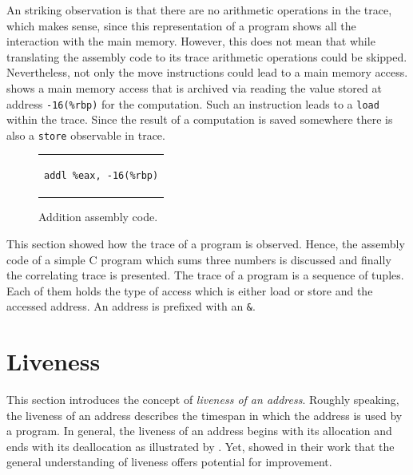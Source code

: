\documentclass[onecolumn, openright, master, english, signatures]{dbrgrptt}
\begin{document}
An striking observation is that there are no arithmetic operations in the \ac{trace}, which makes sense, since this representation of a program shows all the interaction with the main memory.
However, this does not mean that while translating the assembly code to its \ac{trace} arithmetic operations could be skipped.
Nevertheless, not only the move instructions could lead to a main memory access.
 shows a main memory access that is archived via reading the value stored at address \texttt{-16(\%rbp)} for the computation.
Such an instruction leads to a \texttt{load} within the \ac{trace}.
Since the result of a computation is saved somewhere there is also a \texttt{store} observable in \ac{trace}.

\begin{figure}[!ht]
  \centering
  \begin{tabular}{c}
  \begin{lstlisting}
addl %eax, -16(%rbp)
  \end{lstlisting}
  \end{tabular}
  \caption{Addition assembly code.}
  \label{fig:mat-example-addition-detail}
\end{figure}

This section showed how the \ac{trace} of a program is observed.
Hence, the assembly code of a simple C program which sums three numbers is discussed and finally the correlating \ac{trace} is presented.
The \ac{trace} of a program is a sequence of tuples.
Each of them holds the type of access which is either load or store and the accessed address.
An address is prefixed with an \texttt{\&}.


\section{Liveness}\label{sec:liveness}

This section introduces the concept of \emph{liveness of an address}.
Roughly speaking, the liveness of an address describes the timespan in which the address is used by a program.
In general, the liveness of an address begins with its allocation and ends with its deallocation as illustrated by .
Yet, \citeauthor{aigner2013acdc} showed in their work \cite{aigner2013acdc} that the general understanding of liveness offers potential for improvement.
\end{document}
